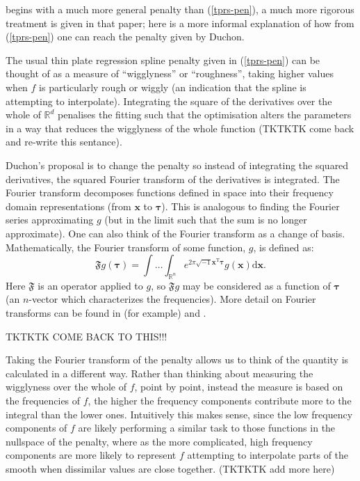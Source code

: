 \cite{duchon77} begins with a much more general penalty than (\ref{tprs-pen}), a much more rigorous treatment is given in that paper; here is a more informal explanation of how from (\ref{tprs-pen}) one can reach the penalty given by Duchon.


The usual thin plate regression spline penalty given in (\ref{tprs-pen}) can be thought of as a measure of ``wigglyness'' or ``roughness'', taking higher values when $f$ is particularly rough or wiggly (an indication that the spline is attempting to interpolate). Integrating the square of the derivatives over the whole of $\mathbb{R}^d$ penalises the fitting such that the optimisation alters the parameters in a way that reduces the wigglyness of the whole function (TKTKTK come back and re-write this sentance).


Duchon's proposal is to change the penalty so instead of integrating the squared derivatives, the squared Fourier transform of the derivatives is integrated. The Fourier transform decomposes functions defined in space into their frequency domain representations (from $\mathbf{x}$ to $\boldsymbol{\tau}$). This is analogous to finding the Fourier series approximating $g$ (but in the limit such that the sum is no longer approximate). One can also think of the Fourier transform as a change of basis. Mathematically, the Fourier transform of some function, $g$, is defined as:
\begin{equation*}
\mathfrak{F} g(\boldsymbol{\tau}) = \int \ldots \int_{\mathbb{R}^n} e^{2 \pi \sqrt{-1} \mathbf{x}^\text{T} \boldsymbol{\tau}} g(\mathbf{x}) \text{d}\mathbf{x}.
\end{equation*}
Here $\mathfrak{F}$ is an operator applied to $g$, so $\mathfrak{F}g$ may be considered as a function of $\boldsymbol{\tau}$ (an $n$-vector which characterizes the frequencies). More detail on Fourier transforms can be found in (for example) \cite{bracewell} and \cite{beerends}. 

TKTKTK COME BACK TO THIS!!!

Taking the Fourier transform of the penalty allows us to think of the quantity is calculated in a different way. Rather than thinking about measuring the wigglyness over the whole of $f$, point by point, instead the measure is based on the frequencies of $f$, the higher the frequency components contribute more to the integral than the lower ones. Intuitively this makes sense, since the low frequency components of $f$ are likely performing a similar task to those functions in the nullspace of the penalty, where as the more complicated, high frequency components are more likely to represent $f$ attempting to interpolate parts of the smooth when dissimilar values are close together. (TKTKTK add more here)


